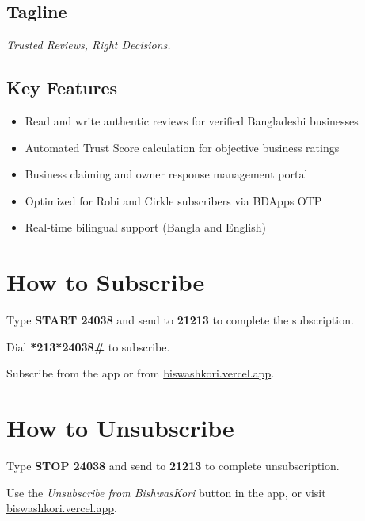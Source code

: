 \documentclass[11pt,a4paper]{article}
\begin{document}
\subsection*{Tagline}
\textit{Trusted Reviews, Right Decisions.}

\subsection*{Key Features}
\begin{itemize}[leftmargin=1.4em,itemsep=2pt]
  \item Read and write authentic reviews for verified Bangladeshi businesses
  \item Automated Trust Score calculation for objective business ratings
  \item Business claiming and owner response management portal
  \item Optimized for Robi and Cirkle subscribers via BDApps OTP
  \item Real-time bilingual support (Bangla and English)
\end{itemize}

\section*{How to Subscribe}

\begin{description}[leftmargin=1.6em,style=nextline,itemsep=6pt]
  \item[$\bullet$ SMS]
    Type \textbf{START 24038} and send to \textbf{21213} to complete the
    subscription.
  \item[$\bullet$ USSD]
    Dial \textbf{*213*24038\#} to subscribe.
  \item[$\bullet$ Web / App]
    Subscribe from the app or from
    \href{https://biswashkori.vercel.app/}{biswashkori.vercel.app}.
\end{description}

\section*{How to Unsubscribe}

\begin{description}[leftmargin=1.6em,style=nextline,itemsep=6pt]
  \item[$\bullet$ SMS]
    Type \textbf{STOP 24038} and send to \textbf{21213} to complete
    unsubscription.
  \item[$\bullet$ Web / App]
    Use the \textit{Unsubscribe from BishwasKori} button in the app, or
    visit \href{https://biswashkori.vercel.app/}{biswashkori.vercel.app}.
\end{description}
\end{document}
